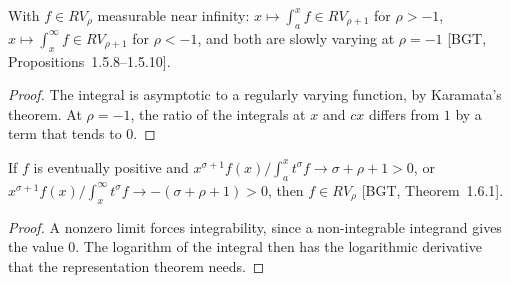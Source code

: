 \begin{theorem}
  \label{thm:rv-integrals}
  \leanok
  With $f \in RV_\rho$ measurable near infinity: $x \mapsto \int_a^x f \in RV_{\rho + 1}$ for $\rho > -1$,
  $x \mapsto \int_x^\infty f \in RV_{\rho + 1}$ for $\rho < -1$, and both are slowly varying at $\rho = -1$
  [BGT, Propositions~1.5.8--1.5.10].
\end{theorem}
\begin{proof}
  \leanok
  The integral is asymptotic to a regularly varying function, by Karamata's theorem. At $\rho = -1$, the
  ratio of the integrals at $x$ and $cx$ differs from $1$ by a term that tends to $0$.
\end{proof}

\begin{theorem}
  \label{thm:karamata-converse-weighted}
  \leanok
  If $f$ is eventually positive and $x^{\sigma + 1} f(x) / \int_a^x t^\sigma f \to \sigma + \rho + 1 > 0$, or
  $x^{\sigma + 1} f(x) / \int_x^\infty t^\sigma f \to -(\sigma + \rho + 1) > 0$, then $f \in RV_\rho$
  [BGT, Theorem~1.6.1].
\end{theorem}
\begin{proof}
  \leanok
  A nonzero limit forces integrability, since a non-integrable integrand gives the value $0$. The
  logarithm of the integral then has the logarithmic derivative that the representation theorem needs.
\end{proof}
